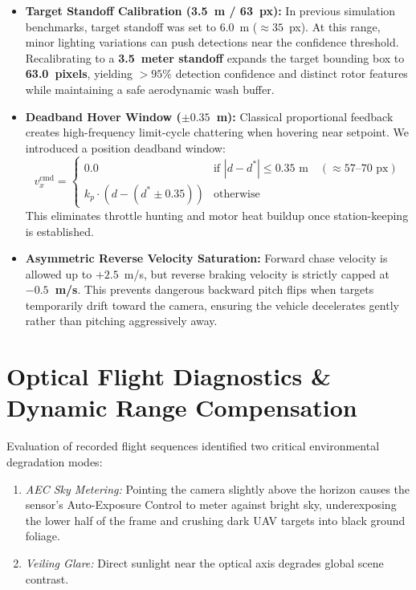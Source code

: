 \documentclass[11pt,a4paper]{article}
\begin{document}
\begin{itemize}[leftmargin=1.5em, itemsep=0.3em]
    \item \textbf{Target Standoff Calibration (3.5~m / 63~px):} In previous simulation benchmarks, target standoff was set to 6.0~m ($\approx 35$~px). At this range, minor lighting variations can push detections near the confidence threshold. Recalibrating to a \textbf{3.5~meter standoff} expands the target bounding box to \textbf{63.0~pixels}, yielding $>95\%$ detection confidence and distinct rotor features while maintaining a safe aerodynamic wash buffer.
    \item \textbf{Deadband Hover Window ($\pm 0.35$~m):} Classical proportional feedback creates high-frequency limit-cycle chattering when hovering near setpoint. We introduced a position deadband window:
    \begin{equation}
        v_x^{\text{cmd}} = \begin{cases} 
            0.0 & \text{if } |d - d^*| \le 0.35\text{ m} \quad (\approx 57\text{--}70\text{ px}) \\
            k_p \cdot (d - (d^* \pm 0.35)) & \text{otherwise}
        \end{cases}
    \end{equation}
    This eliminates throttle hunting and motor heat buildup once station-keeping is established.
    \item \textbf{Asymmetric Reverse Velocity Saturation:} Forward chase velocity is allowed up to $+2.5$~m/s, but reverse braking velocity is strictly capped at \textbf{$-0.5$~m/s}. This prevents dangerous backward pitch flips when targets temporarily drift toward the camera, ensuring the vehicle decelerates gently rather than pitching aggressively away.
\end{itemize}

\section{Optical Flight Diagnostics \& Dynamic Range Compensation}
Evaluation of recorded flight sequences identified two critical environmental degradation modes:
\begin{enumerate}[leftmargin=1.2em, itemsep=0.1em]
    \item \textit{AEC Sky Metering:} Pointing the camera slightly above the horizon causes the sensor's Auto-Exposure Control to meter against bright sky, underexposing the lower half of the frame and crushing dark UAV targets into black ground foliage.
    \item \textit{Veiling Glare:} Direct sunlight near the optical axis degrades global scene contrast.
\end{enumerate}
\end{document}

